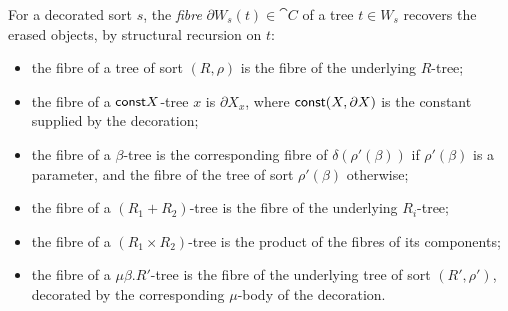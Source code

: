 \begin{definition}[Fibres]
\label{def:polynomial-types:fibres}
For a decorated sort $s$, the \emph{fibre} $\partial W_s(t) \in \cat{C}$ of a tree $t \in W_s$
recovers the erased objects, by structural recursion on $t$:
\begin{itemize}
\item the fibre of a tree of sort $(R, \rho)$ is the fibre of the underlying $R$-tree;
\item the fibre of a $\mathsf{const} X$-tree $x$ is $\partial X_x$, where $\mathsf{const}(X, \partial X)$ is the
  constant supplied by the decoration;
\item the fibre of a $\beta$-tree is the corresponding fibre of $\delta(\rho'(\beta))$ if
  $\rho'(\beta)$ is a parameter, and the fibre of the tree of sort $\rho'(\beta)$ otherwise;
\item the fibre of a $(R_1 + R_2)$-tree is the fibre of the underlying $R_i$-tree;
\item the fibre of a $(R_1 \times R_2)$-tree is the product of the fibres of its components;
\item the fibre of a $\mu\beta.R'$-tree is the fibre of the underlying tree of sort $(R', \rho')$,
  decorated by the corresponding $\mu$-body of the decoration.
\end{itemize}
\end{definition}

